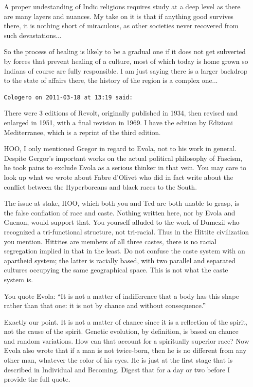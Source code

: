 \begin{footnotesize}
\begin{sffamily}
A proper undestanding of Indic religions requires study at a deep level as there are many layers and nuances. My take on it is that if anything good survives there, it is nothing short of miraculous, as other societies never recovered from such devastations... 

So the process of healing is likely to be a gradual one if it does not get subverted by forces that prevent healing of a culture, most of which today is home grown so Indians of course are fully responsible. I am just saying there is a larger backdrop to the state of affairs there, the history of the region is a complex one... 

\hfill

\texttt{Cologero on 2011-03-18 at 13:19 said:}

There were 3 editions of Revolt, originally published in 1934, then revised and enlarged in 1951, with a final revision in 1969. I have the edition by Edizioni Mediterranee, which is a reprint of the third edition.

HOO, I only mentioned Gregor in regard to Evola, not to his work in general. Despite Gergor's important works on the actual political philosophy of Fascism, he took pains to exclude Evola as a serious thinker in that vein. You may care to look up what we wrote about Fabre d'Olivet who did in fact write about the conflict between the Hyperboreans and black races to the South.

The issue at stake, HOO, which both you and Ted are both unable to grasp, is the false conflation of race and caste. Nothing written here, nor by Evola and Guenon, would support that. You yourself alluded to the work of Dumezil who recognized a tri-functional structure, not tri-racial. Thus in the Hittite civilization you mention. Hittites are members of all three castes, there is no racial segregation implied in that in the least. Do not confuse the caste system with an apartheid system; the latter is racially based, with two parallel and separated cultures occupying the same geographical space. This is not what the caste system is.

You quote Evola: ``It is not a matter of indifference that a body has this shape rather than that one: it is not by chance and without consequence.''

Exactly our point. It is not a matter of chance since it is a reflection of the spirit, not the cause of the spirit. Genetic evolution, by definition, is based on chance and random variations. How can that account for a spiritually superior race? Now Evola also wrote that if a man is not twice-born, then he is no different from any other man, whatever the color of his eyes. He is just at the first stage that is described in Individual and Becoming. Digest that for a day or two before I provide the full quote.


\end{sffamily}
\end{footnotesize}
